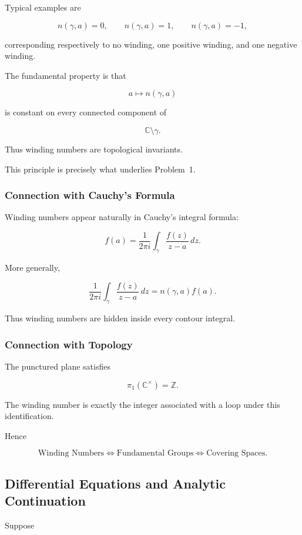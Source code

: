 \documentclass[12pt,a4paper]{article}
\theoremstyle{notespace}
\begin{document}
Typical examples are

\[
n(\gamma,a)=0,
\qquad
n(\gamma,a)=1,
\qquad
n(\gamma,a)=-1,
\]

corresponding respectively to no winding, one positive winding, and one negative winding.

The fundamental property is that

\[
a\longmapsto n(\gamma,a)
\]

is constant on every connected component of

\[
\mathbb C\setminus\gamma.
\]

Thus winding numbers are topological invariants.

This principle is precisely what underlies Problem~1.

\subsubsection*{Connection with Cauchy's Formula}

Winding numbers appear naturally in Cauchy's integral formula:

\[
f(a)
=
\frac{1}{2\pi i}
\int_\gamma
\frac{f(z)}{z-a}\,dz.
\]

More generally,

\[
\frac{1}{2\pi i}
\int_\gamma
\frac{f(z)}{z-a}\,dz
=
n(\gamma,a)f(a).
\]

Thus winding numbers are hidden inside every contour integral.

\subsubsection*{Connection with Topology}

The punctured plane satisfies

\[
\pi_1(\mathbb C^\times)
=
\mathbb Z.
\]

The winding number is exactly the integer associated with a loop under this identification.

Hence

\[
\boxed{
	\text{Winding Numbers}
	\Longleftrightarrow
	\text{Fundamental Groups}
	\Longleftrightarrow
	\text{Covering Spaces}.
}
\]

\bigskip

\subsection{ Differential Equations and Analytic Continuation}

Suppose
\end{document}
